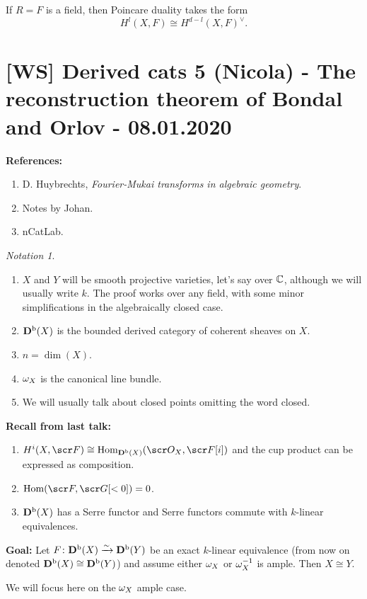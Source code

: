 \documentclass[A4paper, british]{amsart}
\theoremstyle{darkgreentheorem}
\theoremstyle{darkbluedefinition}
\theoremstyle{darkredexample}
\theoremstyle{remark}
\newtheorem{nota}[thm]{Notation}
\DeclareMathOperator{\Hom}{Hom}
\newcommand{\1}{\mathbbm{1}}
\newcommand{\dual}{^{\vee}}
\begin{document}
If $R=F$ is a field, then Poincare duality takes the form
\[ H^{l}(X,F)\cong H^{d-l}(X,F)\dual. \]

\section{[WS] Derived cats 5 (Nicola) - The reconstruction theorem of Bondal and Orlov - 08.01.2020}

\textbf{References:}
\begin{enumerate}
    \item D. Huybrechts, \textit{Fourier-Mukai transforms in algebraic geometry}.
    \item Notes by Johan.
    \item nCatLab.
\end{enumerate}

\begin{nota}
    \begin{enumerate}
	\item $X$ and $Y$ will be smooth projective varieties, let's say over $\mathbb{C}$, although we will usually write $k$.
	    The proof works over any field, with some minor simplifications in the algebraically closed case.
	\item $\mathbf{D}^{\mathrm{b}}(X)$ is the bounded derived category of coherent sheaves on $X$.
	\item $n=\dim(X)$.
	\item $\omega_{X}$ is the canonical line bundle.
	\item We will usually talk about closed points omitting the word closed.
    \end{enumerate}
\end{nota}

\textbf{Recall from last talk:}
\begin{enumerate}
    \item $H^{i}(X,\F)\cong \Hom_{\Db(X)}(\O_{X},\F[i])$ and the cup product can be expressed as composition.
    \item $\Hom(\F,\G[<0])=0$.
    \item $\mathbf{D}^{\mathrm{b}}(X)$ has a Serre functor and Serre functors commute with $k$-linear equivalences.
\end{enumerate}

\textbf{Goal:}
Let $F\colon \mathbf{D}^{\mathrm{b}}(X)\xrightarrow{\sim}\mathbf{D}^{\mathrm{b}}(Y)$ be an exact $k$-linear equivalence (from now on denoted $\mathbf{D}^{\mathrm{b}}(X)\cong \mathbf{D}^{\mathrm{b}}(Y)$) and assume either $\omega_{X}$ or $\omega_{X}^{-1}$ is ample.
Then $X\cong Y$.

We will focus here on the $\omega_{X}$ ample case.
\end{document}
